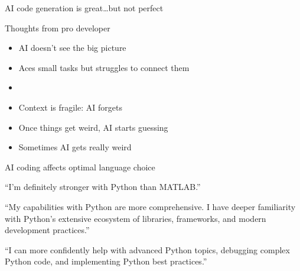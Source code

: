 \begin{frame}
    
    AI code generation is great\ldots but not perfect

\end{frame}


\begin{frame}

    Thoughts from pro developer 

    \begin{itemize}
        \item AI doesn't see the big picture
        \vspace{0.5em}
        \item Aces small tasks but struggles to connect them 
        \vspace{0.5em}
        \item {}
        \vspace{0.5em}
        \item Context is fragile: AI forgets
        \vspace{0.5em}
        \item Once things get weird, AI starts guessing
        \vspace{0.5em}
        \item Sometimes AI gets really weird
    \end{itemize}

\end{frame}


\begin{frame}{AI coding affects optimal language choice}
    
    ``I'm definitely stronger with Python than MATLAB.''

    \vspace{0.5em}
    \vspace{0.5em}
    ``My capabilities with Python
    are more comprehensive. I have deeper familiarity with Python's extensive
    ecosystem of libraries, frameworks, and modern development practices.''


    \vspace{0.5em}
    \vspace{0.5em}
    ``I can
    more confidently help with advanced Python topics, debugging complex Python
    code, and implementing Python best practices.''

\end{frame}

